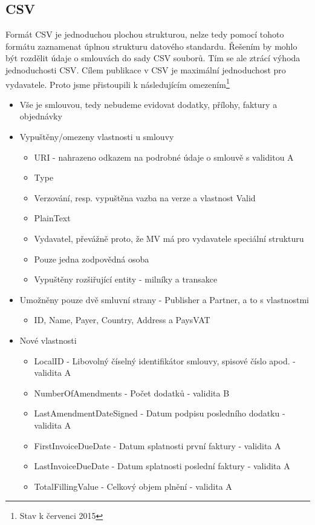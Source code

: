\newpage



\newpage

\subsection{CSV}

Formát CSV je jednoduchou plochou strukturou, nelze tedy pomocí tohoto formátu zaznamenat úplnou strukturu datového standardu. Řešením by mohlo být rozdělit údaje o smlouvách do sady CSV souborů. Tím se ale ztrácí výhoda jednoduchosti CSV. Cílem publikace v CSV je maximální jednoduchost pro vydavatele. Proto jsme přistoupili k následujícím omezením\footnote{Stav k červenci 2015}

\begin{itemize}
\item Vše je smlouvou, tedy nebudeme evidovat dodatky, přílohy, faktury a objednávky
\item Vypuštěny/omezeny vlastnosti u smlouvy
	\begin{itemize}
	\item URI - nahrazeno odkazem na podrobné údaje o smlouvě s validitou A
	\item Type
	\item Verzování, resp. vypuštěna vazba na verze a vlastnost Valid
	\item PlainText
	\item Vydavatel, převážně proto, že MV má pro vydavatele speciální strukturu
	\item Pouze jedna zodpovědná osoba
	\item Vypuštěny rozšiřující entity - milníky a transakce
	\end{itemize}
\item Umožněny pouze dvě  smluvní strany - Publisher a Partner, a to s vlastnostmi
	\begin{itemize}
	\item ID, Name, Payer, Country, Address a PaysVAT
	\end{itemize}
\item Nové vlastnosti
	\begin{itemize}
	\item LocalID - Libovolný číselný identifikátor smlouvy, spisové číslo apod. - validita A
	\item NumberOfAmendments - Počet dodatků - validita B
	\item LastAmendmentDateSigned - Datum podpisu posledního dodatku - validita A
	\item FirstInvoiceDueDate - Datum splatnosti první faktury - validita A
	\item LastInvoiceDueDate - Datum splatnosti poslední faktury - validita A
	\item TotalFillingValue - Celkový objem plnění - validita A
	\end{itemize}
\end{itemize}

